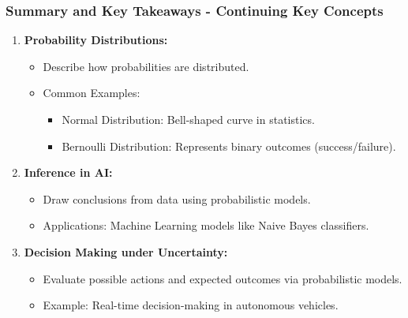 \documentclass[aspectratio=169]{beamer}
\begin{document}
\begin{frame}[fragile]
    \frametitle{Summary and Key Takeaways - Continuing Key Concepts}
    \begin{enumerate}[resume]
        \item \textbf{Probability Distributions:}
            \begin{itemize}
                \item Describe how probabilities are distributed.
                \item Common Examples:
                    \begin{itemize}
                        \item Normal Distribution: Bell-shaped curve in statistics.
                        \item Bernoulli Distribution: Represents binary outcomes (success/failure).
                    \end{itemize}
            \end{itemize}
        \item \textbf{Inference in AI:}
            \begin{itemize}
                \item Draw conclusions from data using probabilistic models.
                \item Applications: Machine Learning models like Naive Bayes classifiers.
            \end{itemize}
        \item \textbf{Decision Making under Uncertainty:}
            \begin{itemize}
                \item Evaluate possible actions and expected outcomes via probabilistic models.
                \item Example: Real-time decision-making in autonomous vehicles.
            \end{itemize}
    \end{enumerate}
\end{frame}
\end{document}
